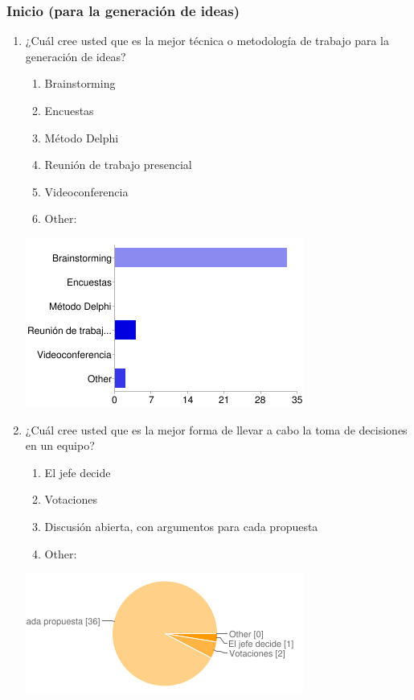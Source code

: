 \subsubsection{Inicio (para la generación de ideas)}
\begin{enumerate}
	\item ¿Cuál cree usted que es la mejor técnica o
		metodología de trabajo para la generación de
		ideas?
		\begin{enumerate}
			\item Brainstorming
			\item Encuestas
			\item Método Delphi
			\item Reunión de trabajo presencial
			\item Videoconferencia
			\item Other: 
		\end{enumerate}
        \begin{center}
        \includegraphics[scale=0.7]{images/encuesta2/1}
        \end{center}
	\item ¿Cuál cree usted que es la mejor forma de
		llevar a cabo la toma de decisiones en un
		equipo?
		\begin{enumerate}
			\item El jefe decide
			\item Votaciones
			\item Discusión abierta, con argumentos
				para cada propuesta
			\item Other: 
		\end{enumerate}
        \begin{center}
        \includegraphics[scale=0.7]{images/encuesta2/2}

\end{center}
\end{enumerate}
